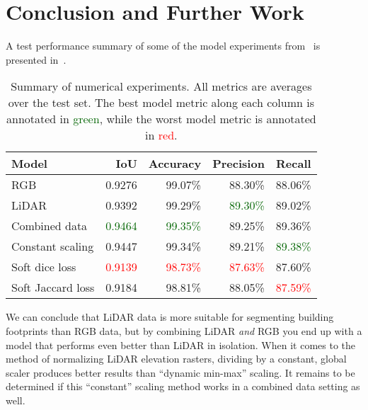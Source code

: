 \section*{Conclusion and Further Work}

A test performance summary of some of the model experiments from~ is presented in~.

\begin{table}[H]
  \centering
  \begin{tabular}{lrrrr}
    \toprule
    Model &                           IoU &                       Accuracy &                      Precision &                         Recall \\
    \midrule
    RGB               &                        0.9276 &                        99.07\% &                        88.30\% &                        88.06\% \\
    LiDAR             &                        0.9392 &                        99.29\% & \textcolor{darkgreen}{89.30\%} &                        89.02\% \\
    Combined data     & \textcolor{darkgreen}{0.9464} & \textcolor{darkgreen}{99.35\%} &                        89.25\% &                        89.36\% \\
    Constant scaling  &                        0.9447 &                        99.34\% &                        89.21\% & \textcolor{darkgreen}{89.38\%} \\
    Soft dice loss    &       \textcolor{red}{0.9139} &       \textcolor{red}{98.73\%} &       \textcolor{red}{87.63\%} &                        87.60\% \\
    Soft Jaccard loss &                        0.9184 &                        98.81\% &                        88.05\% &       \textcolor{red}{87.59\%} \\
    \bottomrule
  \end{tabular}
  \caption{%
    Summary of numerical experiments.
    All metrics are averages over the test set.
    The best model metric along each column is annotated in \textcolor{darkgreen}{green}, while the worst model metric is annotated in \textcolor{red}{red}.
  }%
  \label{tab:experiment-summary}
\end{table} 
%
We can conclude that LiDAR data is more suitable for segmenting building footprints than RGB data, but by combining LiDAR \emph{and} RGB you end up with a model that performs even better than LiDAR in isolation.
When it comes to the method of normalizing LiDAR elevation rasters, dividing by a constant, global scaler produces better results than \enquote{dynamic min-max} scaling.
It remains to be determined if this \enquote{constant} scaling method works in a combined data setting as well.

